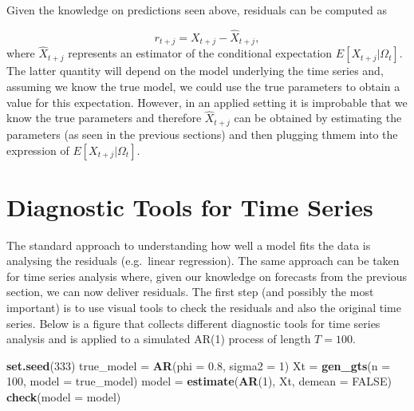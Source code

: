 \documentclass[]{book}
\newenvironment{Shaded}{\begin{snugshade}}{\end{snugshade}}
\newcommand{\KeywordTok}[1]{\textcolor[rgb]{0.13,0.29,0.53}{\textbf{#1}}}
\newcommand{\DataTypeTok}[1]{\textcolor[rgb]{0.13,0.29,0.53}{#1}}
\newcommand{\DecValTok}[1]{\textcolor[rgb]{0.00,0.00,0.81}{#1}}
\newcommand{\FloatTok}[1]{\textcolor[rgb]{0.00,0.00,0.81}{#1}}
\newcommand{\StringTok}[1]{\textcolor[rgb]{0.31,0.60,0.02}{#1}}
\newcommand{\OtherTok}[1]{\textcolor[rgb]{0.56,0.35,0.01}{#1}}
\newcommand{\NormalTok}[1]{#1}
\theoremstyle{definition}
\theoremstyle{definition}
\theoremstyle{definition}
\theoremstyle{remark}
\begin{document}
Given the knowledge on predictions seen above, residuals can be computed
as

\[r_{t+j} = X_{t+j} - \hat{X}_{t+j},\] where \(\hat{X}_{t+j}\)
represents an estimator of the conditional expectation
\(E[X_{t+j} | \Omega_{t}]\). The latter quantity will depend on the
model underlying the time series and, assuming we know the true model,
we could use the true parameters to obtain a value for this expectation.
However, in an applied setting it is improbable that we know the true
parameters and therefore \(\hat{X}_{t+j}\) can be obtained by estimating
the parameters (as seen in the previous sections) and then plugging
thmem into the expression of \(E[X_{t+j} | \Omega_{t}]\).

\section{Diagnostic Tools for Time
Series}\label{diagnostic-tools-for-time-series}

The standard approach to understanding how well a model fits the data is
analysing the residuals (e.g.~linear regression). The same approach can
be taken for time series analysis where, given our knowledge on
forecasts from the previous section, we can now deliver residuals. The
first step (and possibly the most important) is to use visual tools to
check the residuals and also the original time series. Below is a figure
that collects different diagnostic tools for time series analysis and is
applied to a simulated AR(1) process of length \(T = 100\).

\begin{Shaded}
\begin{Highlighting}[]
\KeywordTok{set.seed}\NormalTok{(}\DecValTok{333}\NormalTok{)}
\NormalTok{true_model =}\StringTok{ }\KeywordTok{AR}\NormalTok{(}\DataTypeTok{phi =} \FloatTok{0.8}\NormalTok{, }\DataTypeTok{sigma2 =} \DecValTok{1}\NormalTok{)}
\NormalTok{Xt =}\StringTok{ }\KeywordTok{gen_gts}\NormalTok{(}\DataTypeTok{n =} \DecValTok{100}\NormalTok{, }\DataTypeTok{model =}\NormalTok{ true_model)}
\NormalTok{model =}\StringTok{ }\KeywordTok{estimate}\NormalTok{(}\KeywordTok{AR}\NormalTok{(}\DecValTok{1}\NormalTok{), Xt, }\DataTypeTok{demean =} \OtherTok{FALSE}\NormalTok{)}
\KeywordTok{check}\NormalTok{(}\DataTypeTok{model =}\NormalTok{ model)}
\end{Highlighting}
\end{Shaded}
\end{document}
